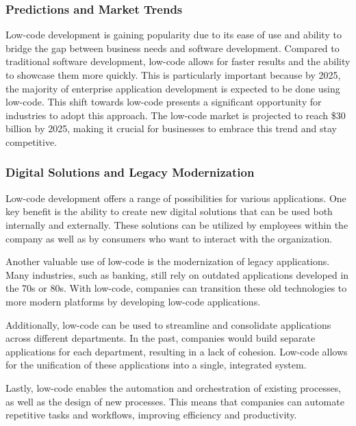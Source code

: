 \subsubsection{Predictions and Market
  Trends}\label{predictions-and-market-trends}

Low-code development is gaining popularity due to its ease of use and
ability to bridge the gap between business needs and software
development. Compared to traditional software development, low-code
allows for faster results and the ability to showcase them more quickly.
This is particularly important because by 2025, the majority of
enterprise application development is expected to be done using
low-code. This shift towards low-code presents a significant opportunity
for industries to adopt this approach. The low-code market is projected
to reach \$30 billion by 2025, making it crucial for businesses to
embrace this trend and stay competitive.

\subsubsection{Digital Solutions and Legacy
  Modernization}\label{digital-solutions-and-legacy-modernization}

Low-code development offers a range of possibilities for various
applications. One key benefit is the ability to create new digital
solutions that can be used both internally and externally. These
solutions can be utilized by employees within the company as well as by
consumers who want to interact with the organization.

Another valuable use of low-code is the modernization of legacy
applications. Many industries, such as banking, still rely on outdated
applications developed in the 70s or 80s. With low-code, companies can
transition these old technologies to more modern platforms by developing
low-code applications.

Additionally, low-code can be used to streamline and consolidate
applications across different departments. In the past, companies would
build separate applications for each department, resulting in a lack of
cohesion. Low-code allows for the unification of these applications into
a single, integrated system.

Lastly, low-code enables the automation and orchestration of existing
processes, as well as the design of new processes. This means that
companies can automate repetitive tasks and workflows, improving
efficiency and productivity.


